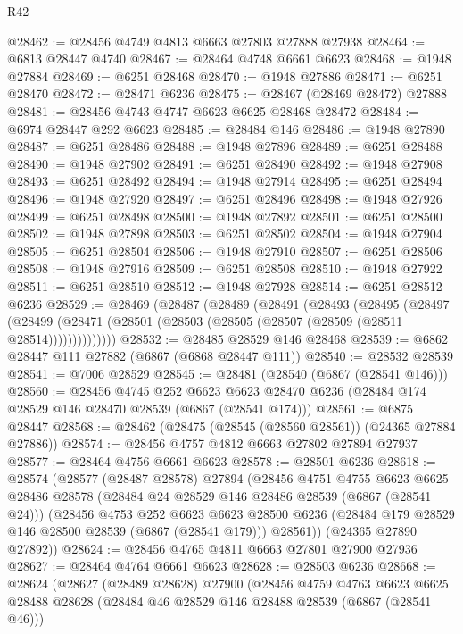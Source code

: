 \begin{lexlean}{R42}
\begin{coremodule}
{@28462 := @28456 @4749 @4813 @6663 @27803 @27888 @27938
@28464 := @6813 @28447 @4740
@28467 := @28464 @4748 @6661 @6623
@28468 := @1948 @27884
@28469 := @6251 @28468
@28470 := @1948 @27886
@28471 := @6251 @28470
@28472 := @28471 @6236
@28475 := @28467 (@28469 @28472) @27888
@28481 := @28456 @4743 @4747 @6623 @6625 @28468 @28472
@28484 := @6974 @28447 @292 @6623
@28485 := @28484 @146
@28486 := @1948 @27890
@28487 := @6251 @28486
@28488 := @1948 @27896
@28489 := @6251 @28488
@28490 := @1948 @27902
@28491 := @6251 @28490
@28492 := @1948 @27908
@28493 := @6251 @28492
@28494 := @1948 @27914
@28495 := @6251 @28494
@28496 := @1948 @27920
@28497 := @6251 @28496
@28498 := @1948 @27926
@28499 := @6251 @28498
@28500 := @1948 @27892
@28501 := @6251 @28500
@28502 := @1948 @27898
@28503 := @6251 @28502
@28504 := @1948 @27904
@28505 := @6251 @28504
@28506 := @1948 @27910
@28507 := @6251 @28506
@28508 := @1948 @27916
@28509 := @6251 @28508
@28510 := @1948 @27922
@28511 := @6251 @28510
@28512 := @1948 @27928
@28514 := @6251 @28512 @6236
@28529 := @28469
    (@28487
      (@28489
        (@28491
          (@28493
            (@28495
              (@28497
                (@28499 (@28471 (@28501 (@28503 (@28505 (@28507 (@28509 (@28511 @28514))))))))))))))
@28532 := @28485 @28529 @146 @28468
@28539 := @6862 @28447 @111 @27882 (@6867 (@6868 @28447 @111))
@28540 := @28532 @28539
@28541 := @7006 @28529
@28545 := @28481 (@28540 (@6867 (@28541 @146)))
@28560 := @28456
    @4745
    @252
    @6623
    @6623
    @28470
    @6236
    (@28484 @174 @28529 @146 @28470 @28539 (@6867 (@28541 @174)))
@28561 := @6875 @28447
@28568 := @28462 (@28475 (@28545 (@28560 @28561)) (@24365 @27884 @27886))
@28574 := @28456 @4757 @4812 @6663 @27802 @27894 @27937
@28577 := @28464 @4756 @6661 @6623
@28578 := @28501 @6236
@28618 := @28574
    (@28577
      (@28487 @28578)
      @27894
      (@28456
        @4751
        @4755
        @6623
        @6625
        @28486
        @28578
        (@28484 @24 @28529 @146 @28486 @28539 (@6867 (@28541 @24)))
        (@28456
          @4753
          @252
          @6623
          @6623
          @28500
          @6236
          (@28484 @179 @28529 @146 @28500 @28539 (@6867 (@28541 @179)))
          @28561))
      (@24365 @27890 @27892))
@28624 := @28456 @4765 @4811 @6663 @27801 @27900 @27936
@28627 := @28464 @4764 @6661 @6623
@28628 := @28503 @6236
@28668 := @28624
    (@28627
      (@28489 @28628)
      @27900
      (@28456
        @4759
        @4763
        @6623
        @6625
        @28488
        @28628
        (@28484 @46 @28529 @146 @28488 @28539 (@6867 (@28541 @46)))
}
\end{coremodule}
\end{lexlean}
